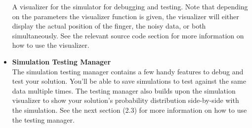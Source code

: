 \documentclass{article}
\begin{document}
\begin{itemize}
        A visualizer for the simulator for debugging and testing. Note that depending on the parameters the visualizer function is given, the visualizer will either display the actual position of the finger, the noisy data, or both simultaneously. See the relevant source code section for more information on how to use the visualizer.
        \item \textbf{Simulation Testing Manager}\\
        The simulation testing manager contains a few handy features to debug and test your solution. You'll be able to save simulations to test against the same data multiple times. The testing manager also builds upon the simulation visualizer to show your solution's probability distribution side-by-side with the simulation. See the next section (2.3) for more information on how to use the testing manager.
    \end{itemize}
\end{document}
